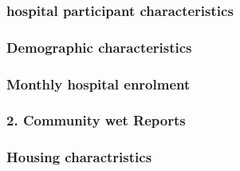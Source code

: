 \documentclass[
]{article}
\begin{document}
\subsubsection{hospital participant
characteristics}\label{hospital-participant-characteristics}

\subsubsection{Demographic
characteristics}\label{demographic-characteristics}

\subsubsection{Monthly hospital
enrolment}\label{monthly-hospital-enrolment}

\subsubsection{2. Community wet Reports}\label{community-wet-reports}

\begin{table}[!h]

\caption{\label{tab:unnamed-chunk-12}Households summary}
\end{table}

\subsubsection{Housing charactristics}\label{housing-charactristics}
\end{document}
